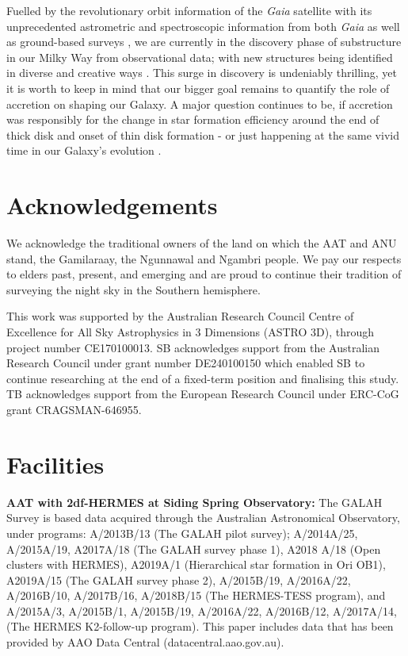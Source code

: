 \documentclass[fleqn,usenatbib]{mnras}
\begin{document}
Fuelled by the revolutionary orbit information of the \textit{Gaia} satellite \citep{Brown2016, Brown2018, Brown2021, Vallenari2023} with its unprecedented astrometric \citep{Lindegren2016, Lindegren2018, Lindegren2021a} and spectroscopic information from both \textit{Gaia} \citep{Katz2019, Katz2022} as well as ground-based surveys \citep[e.g.][]{SDSSDR17, Buder2021, Zhao2012, Conroy2019}, we are currently in the discovery phase of substructure in our Milky Way from observational data; with new structures being identified in diverse and creative ways \citep[e.g.][]{Naidu2021, Malhan2024}. This surge in discovery is undeniably thrilling, yet it is worth to keep in mind that our bigger goal remains to quantify the role of accretion on shaping our Galaxy. A major question continues to be, if accretion was responsibly for the change in star formation efficiency around the end of thick disk and onset of thin disk formation \citep{Conroy2022} - or just happening at the same vivid time in our Galaxy's evolution \citep[see the reviews by][for more extensive discussions]{Helmi2020, Deason2024}.

\section*{Acknowledgements}

We acknowledge the traditional owners of the land on which the AAT and ANU stand, the Gamilaraay, the Ngunnawal and Ngambri people. We pay our respects to elders past, present, and emerging and are proud to continue their tradition of surveying the night sky in the Southern hemisphere.

This work was supported by the Australian Research Council Centre of Excellence for All Sky Astrophysics in 3 Dimensions (ASTRO 3D), through project number CE170100013. SB acknowledges support from the Australian Research Council under grant number DE240100150 which enabled SB to continue researching at the end of a fixed-term position and finalising this study. TB acknowledges support from the European Research Council under ERC-CoG grant CRAGSMAN-646955.

\section*{Facilities}

\textbf{AAT with 2df-HERMES at Siding Spring Observatory:}
The GALAH Survey is based data acquired through the Australian Astronomical Observatory, under programs: A/2013B/13 (The GALAH pilot survey); A/2014A/25, A/2015A/19, A2017A/18 (The GALAH survey phase 1), A2018 A/18 (Open clusters with HERMES), A2019A/1 (Hierarchical star formation in Ori OB1), A2019A/15 (The GALAH survey phase 2), A/2015B/19, A/2016A/22, A/2016B/10, A/2017B/16, A/2018B/15 (The HERMES-TESS program), and A/2015A/3, A/2015B/1, A/2015B/19, A/2016A/22, A/2016B/12, A/2017A/14, (The HERMES K2-follow-up program). This paper includes data that has been provided by AAO Data Central (datacentral.aao.gov.au).
\end{document}

